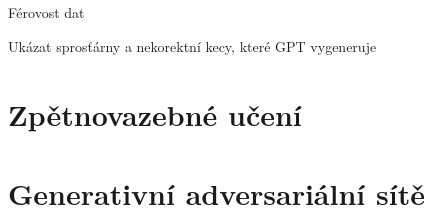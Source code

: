 \documentclass[aspectratio=169,dvipsnames,handout]{beamer}
\begin{document}


\begin{frame}{Férovost dat}

Ukázat sprosťárny a nekorektní kecy, které GPT vygeneruje

\end{frame}


\section{Zpětnovazebné učení}


\section{Generativní adversariální sítě}




%

%


\end{document}
